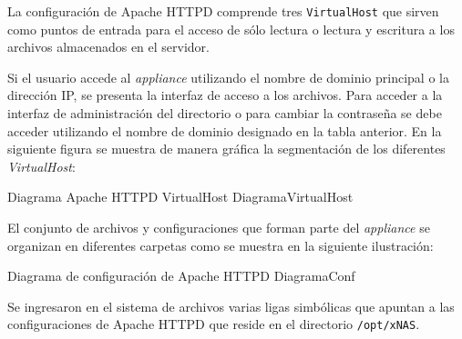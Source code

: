La configuraci\'{o}n de Apache \textsc{HTTPD} comprende tres \texttt{VirtualHost} que sirven como puntos de entrada para el acceso de s\'{o}lo lectura o lectura y escritura a los archivos almacenados en el servidor.

{
 \begin{table}[H]
 \caption{VirtualHost configurados en Apache \textsc{HTTPD}}{}
 \label{tab:virtualhost}
 \noindent{} %
 \end{table}
}

Si el usuario accede al \textit{appliance} utilizando el nombre de dominio principal o la direcci\'{o}n IP, se presenta la interfaz de acceso a los archivos. Para acceder a la interfaz de administraci\'{o}n del directorio o para cambiar la contrase\~{n}a se debe acceder utilizando el nombre de dominio designado en la tabla anterior. En la siguiente figura se muestra de manera gr\'{a}fica la segmentaci\'{o}n de los diferentes \textit{VirtualHost}:

\diagramblock
{Diagrama Apache \textsc{HTTPD} VirtualHost}
{DiagramaVirtualHost}
{
 {
  
 }
}

\newpage
El conjunto de archivos y configuraciones que forman parte del \textit{appliance} se organizan en diferentes carpetas como se muestra en la siguiente ilustraci\'{o}n:

\diagramblock
{Diagrama de configuraci\'{o}n de Apache \textsc{HTTPD}}
{DiagramaConf}
{
 {
  
 }
}

Se ingresaron en el sistema de archivos varias ligas simb\'{o}licas que apuntan a las configuraciones de Apache \textsc{HTTPD} que reside en el directorio \texttt{/opt/xNAS}.

